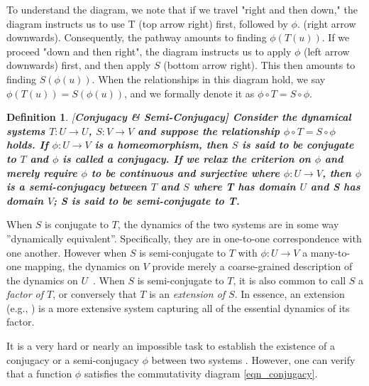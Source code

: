 \documentclass[a4paper,12pt,twoside]{report}
\newtheorem{Definition}{Definition}[]
\begin{document}
To understand the diagram, we note that if we travel "right and then down," the diagram instructs us to use T (top arrow right) first, followed by $\phi$. (right arrow downwards). Consequently, the pathway amounts to finding $\phi(T(u))$. If we proceed "down and then right", the diagram instructs us to apply $\phi$ (left arrow downwards) first, and then apply $S$ (bottom arrow right). This then amounts to finding  $S(\phi(u))$. When the relationships in this diagram hold, we say $\phi(T(u))= S(\phi(u))$, and we formally denote it as $\phi \circ T=S\circ \phi$.

\begin{Definition}\rm  
[\bf {Conjugacy \& Semi-Conjugacy}]\label{Dfn_Conjugate}\rm
   Consider the dynamical systems $T:U\to{U}$, $S:V\to{V}$ and suppose the relationship $\phi \circ T=S\circ \phi$ holds. If $\phi:U\to{V}$ is a homeomorphism, then $S$ is said to be conjugate to $T$ and $\phi$ is called a conjugacy. If we relax the criterion on $\phi$ and merely require $\phi$ to be continuous and surjective where $\phi:U\to{V}$, then $\phi$ is a semi-conjugacy between $T$ and $S$ where T has domain $U$ and S has domain $V$; S is said to be semi-conjugate to T. 
\end{Definition} 

When $S$ is conjugate to $T$, the dynamics of the two systems are in some way ''dynamically equivalent''. Specifically, they are in one-to-one correspondence with one another. However when $S$ is semi-conjugate to $T$ with $\phi:U\to{V}$ a many-to-one mapping, the dynamics on $V$ provide merely a coarse-grained description of the dynamics on $U$~\cite{de2013elements}. When $S$ is semi-conjugate to $T$, it is also common to call $S$ a \emph{factor of $T$}, or conversely that $T$ is an \emph{extension of $S$}. In essence, an extension (e.g., \cite{de2013elements}) is a more extensive system capturing all of the essential dynamics of its factor.

It is a very hard or nearly an impossible task to establish the existence of a conjugacy or a semi-conjugacy $\phi$ between two systems \cite{devaney2018introduction}. However, one can verify that a function $\phi$ satisfies the commutativity diagram \ref{eqn_conjugacy}.  
\end{document}
